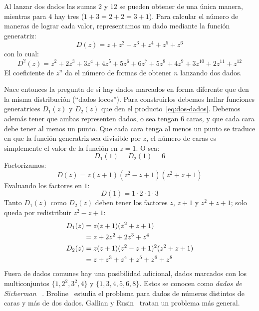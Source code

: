   Al lanzar dos dados
  las sumas \(2\) y \(12\) se pueden obtener de una única manera,
  mientras para \(4\) hay tres (\(1 + 3 = 2 + 2 = 3 + 1\)).
  Para calcular el número de maneras de lograr cada valor,
  representamos un dado mediante la función generatriz:
  \begin{equation}
    \label{eq:gf-dado}
    D(z)
      = z + z^2 + z^3 + z^4 + z^5 + z^6
  \end{equation}
  con lo cual:
  \begin{equation}
    \label{eq:dos-dados}
    D^2(z)
      = z^2 + 2 z^3 + 3 z^4 + 4 z^5 + 5 z^6 + 6 z^7
	  + 5 z^8 + 4 z^9 + 3 z^{10} + 2 z^{11} + z^{12}
  \end{equation}
  El coeficiente de \(z^n\) da
  el número de formas de obtener \(n\) lanzando dos dados.

  Nace entonces la pregunta
  de si hay dados marcados en forma diferente
  que den la misma distribución
  (``dados locos'').%
  Para construirlos
  debemos hallar funciones generatrices \(D_1(z)\) y \(D_2(z)\)
  que den el producto~\eqref{eq:dos-dados}.
  Debemos además tener que ambas representen dados,
  o sea tengan \(6\) caras,
  y que cada cara debe tener al menos un punto.
  Que cada cara tenga al menos un punto
  se traduce en que la función generatriz sea divisible por \(z\),
  el número de caras
  es simplemente el valor de la función en \(z = 1\).
  O sea:
  \begin{equation}
    \label{eq:dados-locos-caras}
    D_1(1)
      = D_2(1)
      = 6
  \end{equation}
  Factorizamos:
  \begin{equation}
    \label{eq:gf-dado-factorizada}
    D(z)
      = z (z + 1) (z^2 - z + 1) (z^2 + z + 1)
  \end{equation}
  Evaluando los factores en \(1\):
  \begin{equation}
    \label{eq:gf-dado-factorizada_1}
    D(1)
      = 1 \cdot 2 \cdot 1 \cdot 3
  \end{equation}
  Tanto \(D_1(z)\) como \(D_2(z)\)
  deben tener los factores \(z\),
  \(z + 1\) y \(z^2 + z + 1\);
  solo queda por redistribuir \(z^2 - z + 1\):
  \begin{align}
    D_1(z)
      &= z (z + 1) (z^2 + z + 1) \notag \\
      &= z + 2 z^2 + 2 z^3 + z^4 \label{eq:Sicherman-1} \\
    D_2(z)
      &= z (z + 1) (z^2 - z + 1)^2 (z^2 + z + 1) \notag \\
      &= z + z^3 + z^4 + z^5 + z^6 + z^8 \label{eq:Sicherman-2}
  \end{align}
  Fuera de dados comunes hay una posibilidad adicional,
  dados marcados con los multiconjuntos \(\{1, 2^2, 3^2, 4\}\)
  y \(\{1, 3, 4, 5, 6, 8\}\).
  Estos se conocen como \emph{dados de Sicherman}~%
    \cite{gardner78_2:_mathem_games}.%
  Broline~\cite{broline79:_renum_faces_dice} estudia el problema
  para dados de números distintos de caras
  y más de dos dados.
  Gallian y Rusin~\cite{gallian79:_cyclot_polyn_nonst_dice}
  tratan un problema más general.

